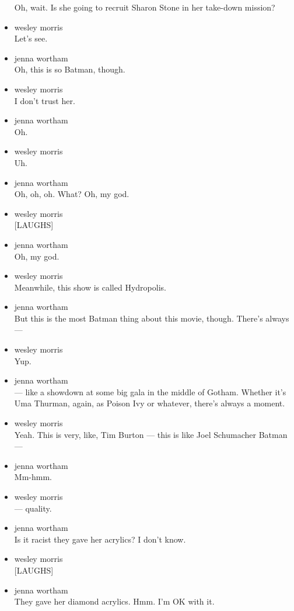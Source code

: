 \begin{itemize}
  Oh, wait. Is she going to recruit Sharon Stone in her take-down
  mission?
\item
  wesley morris\\
  Let's see.
\item
  jenna wortham\\
  Oh, this is so Batman, though.
\item
  wesley morris\\
  I don't trust her.
\item
  jenna wortham\\
  Oh.
\item
  wesley morris\\
  Uh.
\item
  jenna wortham\\
  Oh, oh, oh. What? Oh, my god.
\item
  wesley morris\\
  {[}LAUGHS{]}
\item
  jenna wortham\\
  Oh, my god.
\item
  wesley morris\\
  Meanwhile, this show is called Hydropolis.
\item
  jenna wortham\\
  But this is the most Batman thing about this movie, though. There's
  always ---
\item
  wesley morris\\
  Yup.
\item
  jenna wortham\\
  --- like a showdown at some big gala in the middle of Gotham. Whether
  it's Uma Thurman, again, as Poison Ivy or whatever, there's always a
  moment.
\item
  wesley morris\\
  Yeah. This is very, like, Tim Burton --- this is like Joel Schumacher
  Batman ---
\item
  jenna wortham\\
  Mm-hmm.
\item
  wesley morris\\
  --- quality.
\item
  jenna wortham\\
  Is it racist they gave her acrylics? I don't know.
\item
  wesley morris\\
  {[}LAUGHS{]}
\item
  jenna wortham\\
  They gave her diamond acrylics. Hmm. I'm OK with it.

\end{itemize}
